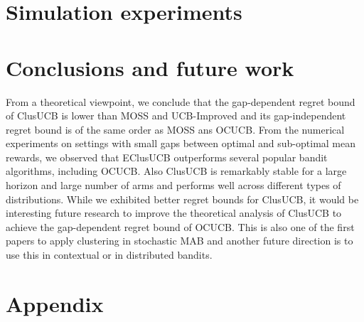 \documentclass{article}
\begin{document}
\section{Simulation experiments}
\label{sec:expts}



\section{Conclusions and future work}
\label{sec:conclusions}
From a theoretical viewpoint, we conclude that the gap-dependent regret bound of ClusUCB is lower than MOSS and UCB-Improved and its gap-independent regret bound is of the same order as MOSS ans OCUCB. From the numerical experiments on settings with small gaps between optimal and sub-optimal mean rewards, we observed that EClusUCB outperforms several popular bandit algorithms,  including OCUCB. Also ClusUCB is remarkably stable for a large horizon and large number of arms and performs well across different types of distributions. While we exhibited better regret bounds for ClusUCB, it would be interesting future research to improve the theoretical analysis of ClusUCB to achieve the gap-dependent regret bound of  OCUCB. This is also one of the first papers to apply clustering in stochastic MAB and another future direction is to use this in contextual or in distributed bandits. 






%



\clearpage
\newpage
\section*{Appendix}

\end{document}
